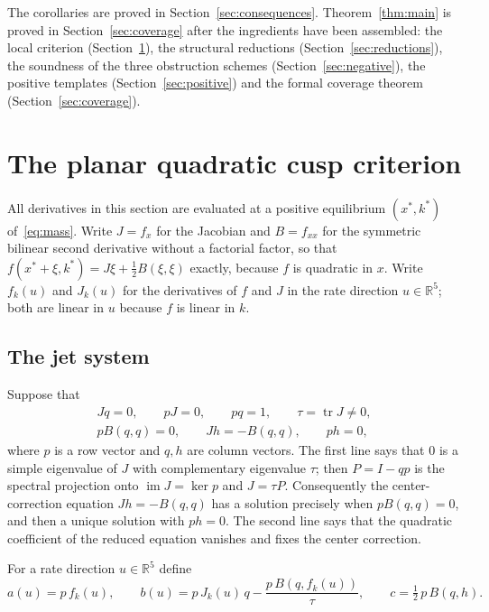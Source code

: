 \documentclass[11pt,a4paper]{article}
\theoremstyle{plain}
\theoremstyle{definition}
\theoremstyle{remark}
\numberwithin{equation}{section}
\newcommand{\R}{\mathbb{R}}
\newcommand{\tr}{\operatorname{tr}}
\newcommand{\im}{\operatorname{im}}
\newcommand{\Ker}{\operatorname{ker}}
\begin{document}
The corollaries are proved in Section~\ref{sec:consequences}. Theorem~\ref{thm:main} is proved in Section~\ref{sec:coverage} after the ingredients have been assembled: the local criterion (Section~\ref{sec:cusp}), the structural reductions (Section~\ref{sec:reductions}), the soundness of the three obstruction schemes (Section~\ref{sec:negative}), the positive templates (Section~\ref{sec:positive}) and the formal coverage theorem (Section~\ref{sec:coverage}).

\section{The planar quadratic cusp criterion}\label{sec:cusp}

All derivatives in this section are evaluated at a positive equilibrium $(x^*,k^*)$ of~\eqref{eq:mass}. Write $J=f_x$ for the Jacobian and $B=f_{xx}$ for the symmetric bilinear second derivative without a factorial factor, so that $f(x^*+\xi,k^*)=J\xi+\tfrac12B(\xi,\xi)$ exactly, because $f$ is quadratic in $x$. Write $f_k(u)$ and $J_k(u)$ for the derivatives of $f$ and $J$ in the rate direction $u\in\R^5$; both are linear in $u$ because $f$ is linear in $k$.

\subsection{The jet system}
Suppose that
\begin{equation}\label{eq:jet}
 \begin{gathered}
 Jq=0,\qquad pJ=0,\qquad pq=1,\qquad \tau=\tr J\ne0,\\
 pB(q,q)=0,\qquad Jh=-B(q,q),\qquad ph=0,
 \end{gathered}
\end{equation}
where $p$ is a row vector and $q,h$ are column vectors. The first line says that $0$ is a simple eigenvalue of $J$ with complementary eigenvalue $\tau$; then $P=I-qp$ is the spectral projection onto $\im J=\Ker p$ and $J=\tau P$. Consequently the center-correction equation $Jh=-B(q,q)$ has a solution precisely when $pB(q,q)=0$, and then a unique solution with $ph=0$. The second line says that the quadratic coefficient of the reduced equation vanishes and fixes the center correction.

For a rate direction $u\in\R^5$ define
\begin{equation}\label{eq:rows}
 a(u)=p\,f_k(u),\qquad
 b(u)=p\,J_k(u)\,q-\frac{p\,B(q,f_k(u))}{\tau},\qquad
 c=\tfrac12\,p\,B(q,h).
\end{equation}
\end{document}
